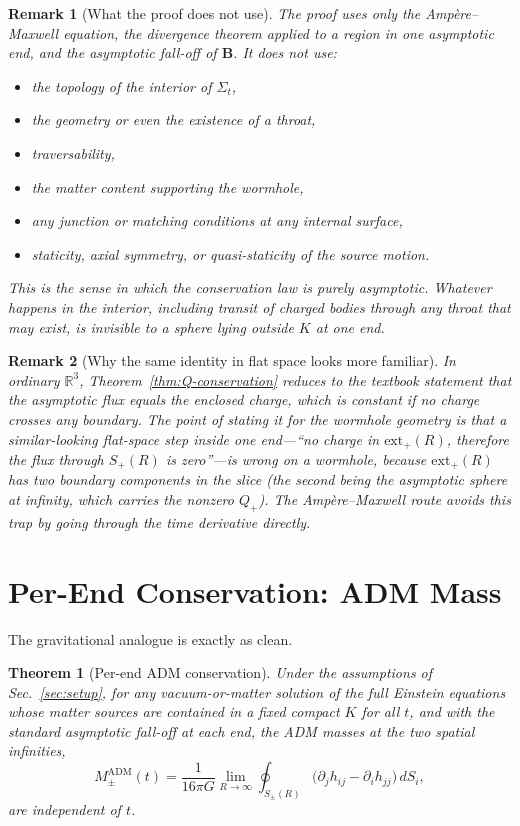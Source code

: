 \documentclass[aps,prd,onecolumn,nofootinbib,superscriptaddress]{revtex4-2}
\newtheorem{theorem}{Theorem}
\newtheorem{remark}{Remark}
\begin{document}
\begin{remark}[What the proof does not use]
The proof uses only the Amp\`ere--Maxwell equation, the divergence theorem applied to a region in one asymptotic end, and the asymptotic fall-off of $\bm{B}$. It does \emph{not} use:
\begin{itemize}
    \item the topology of the interior of $\Sigma_t$,
    \item the geometry or even the existence of a throat,
    \item traversability,
    \item the matter content supporting the wormhole,
    \item any junction or matching conditions at any internal surface,
    \item staticity, axial symmetry, or quasi-staticity of the source motion.
\end{itemize}
This is the sense in which the conservation law is purely asymptotic. Whatever happens in the interior, including transit of charged bodies through any throat that may exist, is invisible to a sphere lying outside $K$ at one end.
\end{remark}

\begin{remark}[Why the same identity in flat space looks more familiar]
In ordinary $\mathbb{R}^3$, Theorem~\ref{thm:Q-conservation} reduces to the textbook statement that the asymptotic flux equals the enclosed charge, which is constant if no charge crosses any boundary. The point of stating it for the wormhole geometry is that a similar-looking flat-space step inside one end---``no charge in $\mathrm{ext}_+(R)$, therefore the flux through $S_+(R)$ is zero''---is wrong on a wormhole, because $\mathrm{ext}_+(R)$ has \emph{two} boundary components in the slice (the second being the asymptotic sphere at infinity, which carries the nonzero $Q_+$). The Amp\`ere--Maxwell route avoids this trap by going through the time derivative directly.
\end{remark}

\section{Per-End Conservation: ADM Mass}
\label{sec:adm}

The gravitational analogue is exactly as clean.

\begin{theorem}[Per-end ADM conservation]
\label{thm:M-conservation}
Under the assumptions of Sec.~\ref{sec:setup}, for any vacuum-or-matter solution of the full Einstein equations whose matter sources are contained in a fixed compact $K$ for all $t$, and with the standard asymptotic fall-off at each end, the ADM masses at the two spatial infinities,
\begin{equation}
M_\pm^{\mathrm{ADM}}(t) = \frac{1}{16\pi G}\lim_{R\to\infty}\oint_{S_\pm(R)} \big(\partial_j h_{ij}-\partial_i h_{jj}\big)\,dS_i,
\end{equation}
are independent of $t$.
\end{theorem}
\end{document}
